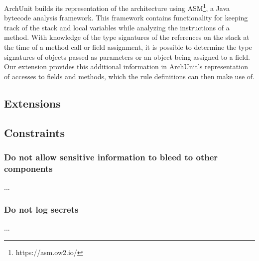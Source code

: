 ArchUnit builds its representation of the architecture using ASM\footnote{https://asm.ow2.io/}, a Java bytecode analysis framework. This framework contains functionality for keeping track of the stack and local variables while analyzing the instructions of a method. With knowledge of the type signatures of the references on the stack at the time of a method call or field assignment, it is possible to determine the type signatures of objects passed as parameters or an object being assigned to a field. Our extension provides this additional information in ArchUnit's representation of accesses to fields and methods, which the rule definitions can then make use of.


\subsection{Extensions}


\subsection{Constraints}


\subsubsection*{Do not allow sensitive information to bleed to other components}
...

\subsubsection*{Do not log secrets}
...

